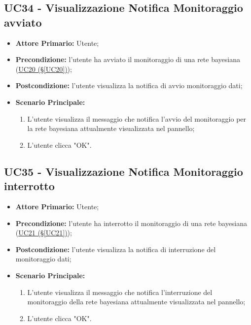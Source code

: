 \pagebreak

\subsection{UC34 - Visualizzazione Notifica Monitoraggio avviato}\label{UC34}

\begin{itemize}
	\item \textbf{Attore Primario:} Utente;
	\item \textbf{Precondizione:} l'utente ha avviato il monitoraggio di una rete bayesiana (\hyperref[UC20]{UC20 (§\ref*{UC20})});
	\item \textbf{Postcondizione:} l'utente visualizza la notifica di avvio monitoraggio dati;
	\item \textbf{Scenario Principale:}
	\begin{enumerate}
		\item L'utente visualizza il messaggio che notifica l'avvio del monitoraggio per la rete bayesiana attualmente visualizzata nel pannello;
		\item L'utente clicca "OK".
	\end{enumerate}
\end{itemize}

\pagebreak

\subsection{UC35 - Visualizzazione Notifica Monitoraggio interrotto}\label{UC35}

\begin{itemize}
	\item \textbf{Attore Primario:} Utente;
	\item \textbf{Precondizione:} l'utente ha interrotto il monitoraggio di una rete bayesiana (\hyperref[UC21]{UC21 (§\ref*{UC21})});
	\item \textbf{Postcondizione:} l'utente visualizza la notifica di interruzione del monitoraggio dati;
	\item \textbf{Scenario Principale:}
	\begin{enumerate}
		\item L'utente visualizza il messaggio che notifica l'interruzione del monitoraggio della rete bayesiana attualmente visualizzata nel pannello;
		\item L'utente clicca "OK".
	\end{enumerate}
\end{itemize}

